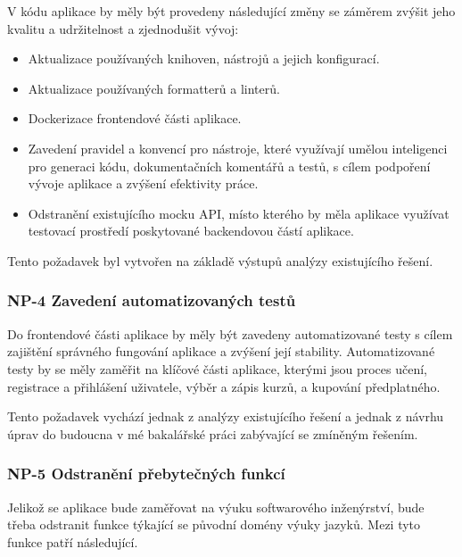 V kódu aplikace by měly být provedeny následující změny se záměrem zvýšit jeho kvalitu a udržitelnost a zjednodušit vývoj:

\begin{itemize}
    \item Aktualizace používaných knihoven, nástrojů a jejich konfigurací.
    \item Aktualizace používaných formatterů a linterů.
    \item Dockerizace frontendové části aplikace.
    \item Zavedení pravidel a konvencí pro nástroje, které využívají umělou inteligenci pro generaci kódu, dokumentačních komentářů a testů, s cílem podpoření vývoje aplikace a zvýšení efektivity práce.
    \item Odstranění existujícího mocku API, místo kterého by měla aplikace využívat testovací prostředí poskytované backendovou částí aplikace.
\end{itemize}

Tento požadavek byl vytvořen na základě výstupů analýzy existujícího řešení.

\subsubsection{NP-4 Zavedení automatizovaných testů}

Do frontendové části aplikace by měly být zavedeny automatizované testy s cílem zajištění správného fungování aplikace a zvýšení její stability. Automatizované testy by se měly zaměřit na klíčové části aplikace, kterými jsou proces učení, registrace a přihlášení uživatele, výběr a zápis kurzů, a kupování předplatného. %

Tento požadavek vychází jednak z analýzy existujícího řešení a jednak z návrhu úprav do budoucna v mé bakalářské práci zabývající se zmíněným řešením. %

\subsubsection{NP-5 Odstranění přebytečných funkcí}

Jelikož se aplikace bude zaměřovat na výuku softwarového inženýrství, bude třeba odstranit funkce týkající se původní domény výuky jazyků. Mezi tyto funkce patří následující.

